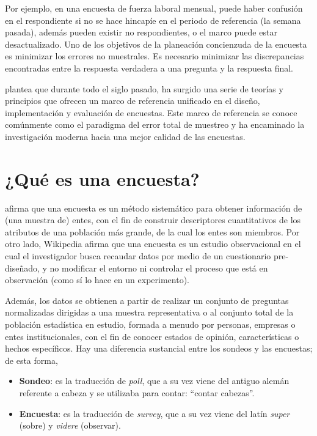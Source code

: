 \documentclass[
  10pt,
  spanish,
]{book}
\providecommand{\tightlist}{%
  \setlength{\itemsep}{0pt}\setlength{\parskip}{0pt}}
\begin{document}
Por ejemplo, en una encuesta de fuerza laboral mensual, puede haber confusión en el respondiente si no se hace hincapíe en el periodo de referencia (la semana pasada), además pueden existir no respondientes, o el marco puede estar desactualizado. Uno de los objetivos de la planeación concienzuda de la encuesta es minimizar los errores no muestrales. Es necesario minimizar las discrepancias encontradas entre la respuesta verdadera a una pregunta y la respuesta final.

\citet{Groves_Fowler_Couper_Lepkowski_Singer_Tourangeau_2009} plantea que durante todo el siglo pasado, ha surgido una serie de teorías y principios que ofrecen un marco de referencia unificado en el diseño, implementación y evaluación de encuestas. Este marco de referencia se conoce comúnmente como el paradigma del error total de muestreo y ha encaminado la investigación moderna hacia una mejor calidad de las encuestas.

\hypertarget{quuxe9-es-una-encuesta}{%
\section{¿Qué es una encuesta?}\label{quuxe9-es-una-encuesta}}

\citet{Groves_Fowler_Couper_Lepkowski_Singer_Tourangeau_2009} afirma que una encuesta es un método sistemático para obtener información de (una muestra de) entes, con el fin de construir descriptores cuantitativos de los atributos de una población más grande, de la cual los entes son miembros.
Por otro lado, Wikipedia afirma que una encuesta es un estudio observacional en el cual el investigador busca recaudar datos por medio de un cuestionario pre-diseñado, y no modificar el entorno ni controlar el proceso que está en observación (como sí lo hace en un experimento).

Además, los datos se obtienen a partir de realizar un conjunto de preguntas normalizadas dirigidas a una muestra representativa o al conjunto total de la población estadística en estudio, formada a menudo por personas, empresas o entes institucionales, con el fin de conocer estados de opinión, características o hechos específicos. Hay una diferencia sustancial entre los sondeos y las encuestas; de esta forma,

\begin{itemize}
\tightlist
\item
  \textbf{Sondeo}: es la traducción de \emph{poll}, que a su vez viene del antiguo alemán referente a cabeza y se utilizaba para contar: ``contar cabezas''.
\item
  \textbf{Encuesta}: es la traducción de \emph{survey}, que a su vez viene del latín \emph{super} (sobre) y \emph{videre} (observar).
\end{itemize}
\end{document}
